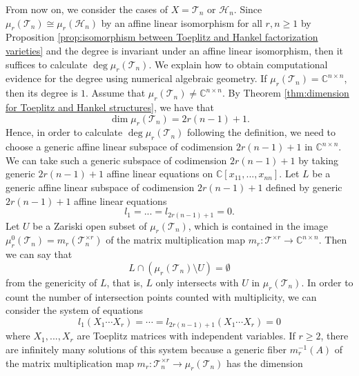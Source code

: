 \documentclass[reqno]{amsart}
\theoremstyle{definition}
\numberwithin{equation}{section}
\begin{document}
From now on, we consider the cases of $X=\mathcal{T}_n$ or $\mathcal{H}_n$. Since $\mu_r(\mathcal{T}_n) \cong \mu_r(\mathcal{H}_n)$ by an affine linear isomorphism for all $r,n \geq 1$ by Proposition \ref{prop:isomorphism between Toeplitz and Hankel factorization varieties} and the degree is invariant under an affine linear isomorphism, then it suffices to calculate $\deg \mu_r(\mathcal{T}_n)$. We explain how to obtain computational evidence for the degree using numerical algebraic geometry. If $\mu_r(\mathcal{T}_n)=\mathbb{C}^{n \times n}$, then its degree is $1$. Assume that $\mu_r(\mathcal{T}_n)\neq\mathbb{C}^{n \times n}$. By Theorem \ref{thm:dimension for Toeplitz and Hankel structures}, we have that
\begin{equation*}
    \dim \mu_r(\mathcal{T}_n)=2r(n-1)+1.
\end{equation*}
Hence, in order to calculate $\deg \mu_r(\mathcal{T}_n)$ following the definition, we need to choose a generic affine linear subspace of codimension $2r(n-1)+1$ in $\mathbb{C}^{n \times n}$. We can take such a generic subspace of codimension $2r(n-1)+1$ by taking generic $2r(n-1)+1$ affine linear equations on $\mathbb{C}[x_{11},...,x_{nn}]$. Let $L$ be a generic affine linear subspace of codimension $2r(n-1)+1$ defined by generic $2r(n-1)+1$ affine linear equations 
\begin{equation*}
    l_1=...=l_{2r(n-1)+1}=0.
\end{equation*}
Let $U$ be a Zariski open subset of $\mu_r(\mathcal{T}_n)$, which is contained in the image $\mu_r^0(\mathcal{T}_n)=m_r(\mathcal{T}_n^{\times r})$ of the matrix multiplication map $m_r:\mathcal{T}^{\times r} \rightarrow \mathbb{C}^{n \times n}$. Then we can say that 
\begin{equation*}
    L \cap (\mu_r(\mathcal{T}_n) \setminus U)=\emptyset
\end{equation*}
from the genericity of $L$, that is, $L$ only intersects with $U$ in $\mu_r(\mathcal{T}_n)$. In order to count
the number of intersection points counted with multiplicity, we can consider the system of equations
\begin{equation}\label{eq:system of essential polynomial equations}
    l_1(X_1\cdots X_r)=\cdots =l_{2r(n-1)+1}(X_1\cdots X_r)=0
\end{equation}
where $X_1,...,X_r$ are Toeplitz matrices with independent variables. If $r \geq 2$, there are infinitely many solutions of this system because a generic fiber $m_r^{-1}(A)$ of the matrix multiplication map $m_r:\mathcal{T}_n^{\times r} \rightarrow \mu_r(\mathcal{T}_n)$ has the dimension
\end{document}
